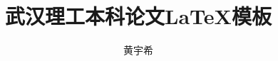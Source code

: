 \documentclass{whut-bachelor}
\title{武汉理工本科论文\LaTeX 模板}	%
\author{黄宇希}	%
\begin{document}
\maketitle



\tableofcontents






\end{document}
